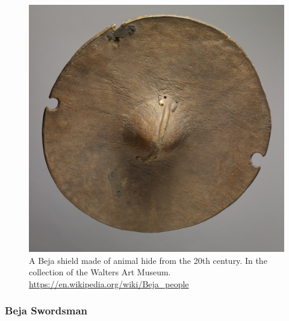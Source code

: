 \documentclass[a4paper,12pt]{scrreprt}
\begin{document}
\begin{figure}[H]
	\centering
	\includegraphics[width=\textwidth]{img/beja/Beja_Shield}
	\caption{A Beja shield made of animal hide from the 20th century. In the collection of the Walters Art Museum. \url{https://en.wikipedia.org/wiki/Beja_people}}
\end{figure}

\subsubsection{Beja Swordsman}
\end{document}
